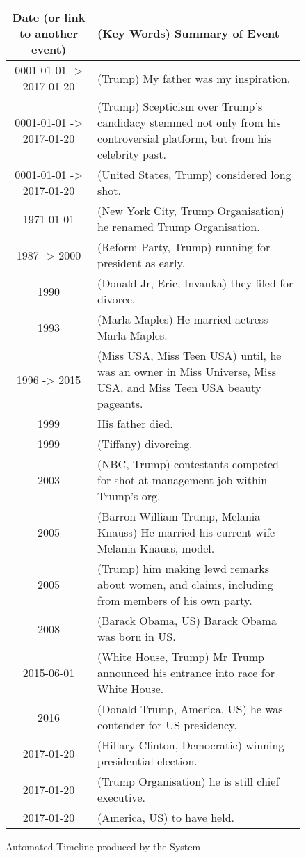 \begin{figure}[H]
\begin{tabular}{|c|p{8.5cm}|}
\hline
Date (or link to another event) & (Key Words)  Summary of Event\\
\hline
\hline
0001-01-01 -> 2017-01-20 & (Trump) My father was my inspiration.\\
\hline
0001-01-01 -> 2017-01-20 & (Trump) Scepticism over Trump's candidacy stemmed not only from his controversial platform, but from his celebrity past.\\
\hline
0001-01-01 -> 2017-01-20 & (United States, Trump) considered long shot.\\
\hline
1971-01-01 & (New York City, Trump Organisation) he renamed Trump Organisation.\\
\hline
1987 -> 2000 & (Reform Party, Trump) running for president as early.\\
\hline
1990 & (Donald Jr, Eric, Invanka) they filed for divorce.\\
\hline
1993 & (Marla Maples) He married actress Marla Maples.\\
\hline
1996 -> 2015 & (Miss USA, Miss Teen USA) until, he was an owner in Miss Universe, Miss USA, and Miss Teen USA beauty pageants.\\
\hline
1999 & His father died.\\
\hline
1999 & (Tiffany) divorcing.\\
\hline
2003 & (NBC, Trump) contestants competed for shot at management job within Trump's org.\\
\hline
2005 & (Barron William Trump, Melania Knauss) He married his current wife Melania Knauss, model.\\
\hline
2005 & (Trump) him making lewd remarks about women, and claims, including from members of his own party.\\
\hline
2008 & (Barack Obama, US) Barack Obama was born in US.\\
\hline
2015-06-01 & (White House, Trump) Mr Trump announced his entrance into race for White House.\\
\hline
2016 & (Donald Trump, America, US) he was contender for US presidency.\\
\hline
2017-01-20 & (Hillary Clinton, Democratic) winning presidential election.\\
\hline
2017-01-20 & (Trump Organisation) he is still chief executive.\\
\hline
2017-01-20 & (America, US) to have held.\\
\hline
\end{tabular}
\caption{Automated Timeline produced by the System}
\end{figure}


